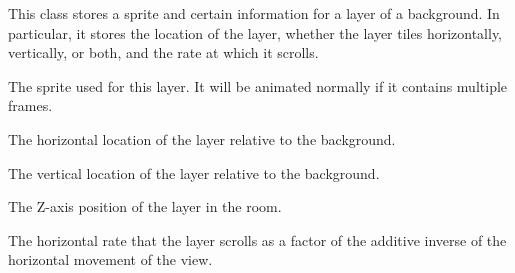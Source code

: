\documentclass[letterpaper,10pt,english]{sphinxmanual}
\begin{document}
\begin{fulllineitems}
\label{gfx:sge.gfx.BackgroundLayer}
This class stores a sprite and certain information for a layer of a
background.  In particular, it stores the location of the layer,
whether the layer tiles horizontally, vertically, or both, and the
rate at which it scrolls.

\begin{fulllineitems}
\label{gfx:sge.gfx.BackgroundLayer.sprite}
The sprite used for this layer.  It will be animated normally if
it contains multiple frames.

\end{fulllineitems}


\begin{fulllineitems}
\label{gfx:sge.gfx.BackgroundLayer.x}
The horizontal location of the layer relative to the background.

\end{fulllineitems}


\begin{fulllineitems}
\label{gfx:sge.gfx.BackgroundLayer.y}
The vertical location of the layer relative to the background.

\end{fulllineitems}


\begin{fulllineitems}
\label{gfx:sge.gfx.BackgroundLayer.z}
The Z-axis position of the layer in the room.

\end{fulllineitems}


\begin{fulllineitems}
\label{gfx:sge.gfx.BackgroundLayer.xscroll_rate}
The horizontal rate that the layer scrolls as a factor of the
additive inverse of the horizontal movement of the view.


\end{fulllineitems}
\end{fulllineitems}
\end{document}
